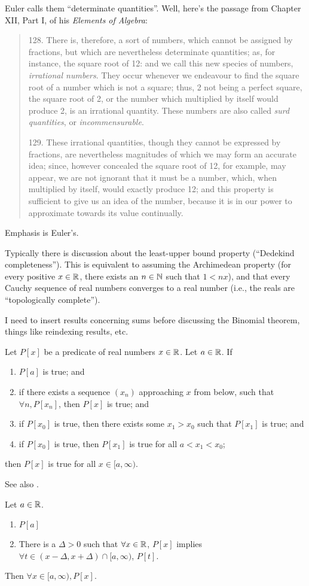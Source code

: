 \begin{remark}
  Euler calls them ``determinate quantities''. Well, here's the passage
  from Chapter XII, Part I, of his \textit{Elements of Algebra}:

  \begin{quotation}
    128. There is, therefore, a sort of numbers, which
cannot be assigned by fractions, but which are nevertheless determinate quantities; as, for instance, the square
root of 12: and we call this new species of numbers,
\emph{irrational numbers}. They occur whenever we endeavour
to find the square root of a number which is not a square;
thus, 2 not being a perfect square, the square root of 2,
or the number which multiplied by itself would produce 2,
is an irrational quantity. These numbers are also called
\emph{surd quantities}, or \emph{incommensurable}.

129. These irrational quantities, though they cannot be
expressed by fractions, are nevertheless magnitudes of which
we may form an accurate idea; since, however concealed
the square root of 12, for example, may appear, we are not
ignorant that it must be a number, which, when multiplied
by itself, would exactly produce 12; and this property is
sufficient to give us an idea of the number, because it is in
our power to approximate towards its value continually.
  \end{quotation}
  Emphasis is Euler's.
\end{remark}

Typically there is discussion about the least-upper bound property
(``Dedekind completeness''). This is equivalent to assuming the
Archimedean property (for every positive $x\in\mathbb{R}$, there exists an
$n\in\mathbb{N}$ such that $1 < nx$), and that every Cauchy sequence of real numbers
converges to a real number (i.e., the reals are ``topologically complete'').

I need to insert results concerning sums before discussing the Binomial
theorem, things like reindexing results, etc.

Let $P[x]$ be a predicate of real numbers $x\in\mathbb{R}$.
Let $a\in\mathbb{R}$.
If
\begin{enumerate}
\item $P[a]$ is true; and
\item if there exists a sequence $(x_{n})$ approaching $x$ from below, such
  that $\forall n,P[x_{n}]$, then $P[x]$ is true; and
\item if $P[x_{0}]$ is true, then there exists some $x_{1} > x_{0}$
  such that $P[x_{1}]$ is true; and
\item if $P[x_{0}]$ is true, then $P[x_{1}]$ is true for all $a<x_{1}<x_{0}$;
\end{enumerate}
then $P[x]$ is true for all $x\in[a,\infty)$.

\bigbreak
See also .

Let $a\in\mathbb{R}$.
\begin{enumerate}
\item $P[a]$
\item There is a $\Delta>0$ such that $\forall x\in\mathbb{R}$, $P[x]$ implies
  $\forall t\in(x-\Delta,x+\Delta)\cap[a,\infty)$, $P[t]$.
\end{enumerate}
Then $\forall x\in[a,\infty),P[x]$.